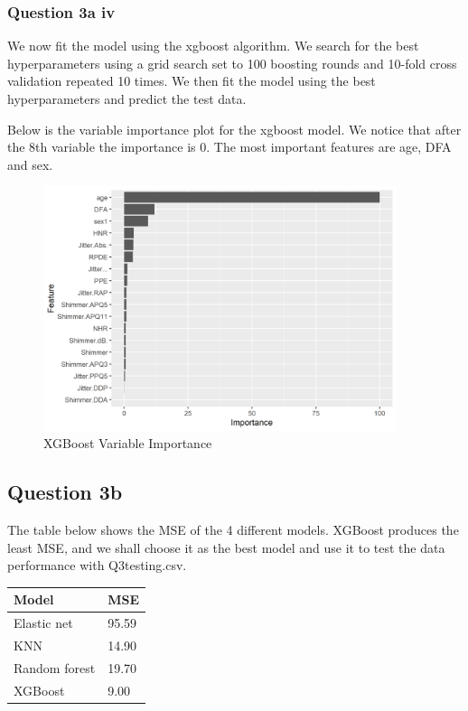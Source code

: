 \documentclass[
]{article}
\begin{document}
\hypertarget{question-3a-iv}{%
\subsubsection{Question 3a iv}\label{question-3a-iv}}

We now fit the model using the xgboost algorithm. We search for the best
hyperparameters using a grid search set to 100 boosting rounds and
10-fold cross validation repeated 10 times. We then fit the model using
the best hyperparameters and predict the test data.

Below is the variable importance plot for the xgboost model. We notice
that after the 8th variable the importance is 0. The most important
features are age, DFA and sex.

\begin{figure}
\centering
\includegraphics[width=4.07292in,height=\textheight]{varimpo_xgboost.png}
\caption{XGBoost Variable Importance}
\end{figure}

\hypertarget{question-3b}{%
\subsection{Question 3b}\label{question-3b}}

The table below shows the MSE of the 4 different models. XGBoost
produces the least MSE, and we shall choose it as the best model and use
it to test the data performance with Q3testing.csv.

\begin{longtable}[]{@{}ll@{}}
\toprule\noalign{}
Model & MSE \\
\midrule\noalign{}
\endhead
\bottomrule\noalign{}
\endlastfoot
Elastic net & 95.59 \\
KNN & 14.90 \\
Random forest & 19.70 \\
XGBoost & 9.00 \\
\end{longtable}
\end{document}
